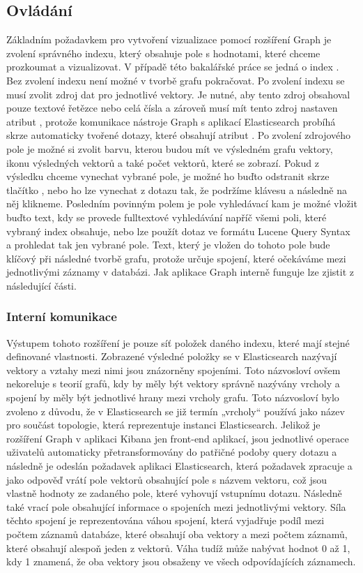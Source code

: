 \documentclass[czech,BP]{thesiskiv}
\begin{document}
\subsection{Ovládání}
Základním požadavkem pro vytvoření vizualizace pomocí rozšíření Graph je zvolení správného indexu, který obsahuje pole s hodnotami, které chceme prozkoumat a vizualizovat. V případě této bakalářské práce se jedná o index . Bez zvolení indexu není možné v tvorbě grafu pokračovat. Po zvolení indexu se musí zvolit zdroj dat pro jednotlivé vektory. Je nutné, aby tento zdroj obsahoval pouze textové řetězce nebo celá čísla a zároveň musí mít tento zdroj nastaven atribut , protože komunikace nástroje Graph s aplikací Elasticsearch probíhá skrze automaticky tvořené dotazy, které obsahují atribut . Po zvolení zdrojového pole je možné si zvolit barvu, kterou budou mít ve výsledném grafu vektory, ikonu výsledných vektorů a také počet vektorů, které se zobrazí. Pokud z výsledku chceme vynechat vybrané pole, je možné ho buďto odstranit skrze tlačítko , nebo ho lze vynechat z dotazu tak, že podržíme klávesu  a následně na něj klikneme.  Posledním povinným polem je pole vyhledávací kam je možné vložit buďto text, kdy se provede fulltextové vyhledávání napříč všemi poli, které vybraný index obsahuje, nebo lze použít dotaz ve formátu Lucene Query Syntax a prohledat tak jen vybrané pole. Text, který je vložen do tohoto pole bude klíčový při následné tvorbě grafu, protože určuje spojení, které očekáváme mezi jednotlivými záznamy v databázi. Jak aplikace Graph interně funguje lze zjistit z následující části.
\subsubsection{Interní komunikace}
Výstupem tohoto rozšíření je pouze síť položek daného indexu, které mají stejné definované vlastnosti. Zobrazené výsledné položky se v Elasticsearch nazývají vektory a vztahy mezi nimi jsou znázorněny spojeními. Toto názvosloví ovšem nekoreluje s teorií grafů, kdy by měly být vektory správně nazývány vrcholy a spojení by měly být jednotlivé hrany mezi vrcholy grafu. Toto názvosloví bylo zvoleno z důvodu, že v Elasticsearch se již termín „vrcholy“ používá jako název pro součást topologie, která reprezentuje instanci Elasticsearch. 
\newline
Jelikož je rozšíření Graph v aplikaci Kibana jen front-end aplikací, jsou jednotlivé operace uživatelů automaticky přetransformovány do patřičné podoby query dotazu a následně je odeslán požadavek aplikaci Elasticsearch, která požadavek zpracuje a jako odpověď vrátí pole vektorů obsahující pole s názvem vektoru, což jsou vlastně hodnoty ze zadaného pole, které vyhovují vstupnímu dotazu. Následně také vrací pole obsahující informace o spojeních mezi jednotlivými vektory. Síla těchto spojení je reprezentována váhou spojení, která vyjadřuje podíl mezi počtem záznamů databáze, které obsahují oba vektory a mezi počtem záznamů, které obsahují alespoň jeden z vektorů. Váha tudíž může nabývat hodnot 0 až 1,  kdy 1 znamená, že oba vektory jsou obsaženy ve všech odpovídajících záznamech.
\end{document}
